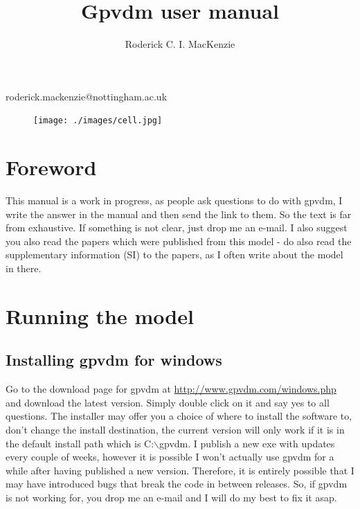 \documentclass[11pt]{article}
\begin{document}
\title{Gpvdm user manual}

\author{Roderick C. I. MacKenzie}


\maketitle




\centerline{roderick.mackenzie@nottingham.ac.uk}


\begin{figure}[ht!]
\centering
\texttt{[image: ./images/cell.jpg]}
\label{overflow}
\end{figure}

\newpage
\section{Foreword}
This manual is a work in progress, as people ask questions to do with gpvdm, I write the answer in the manual and then send the link to them.  So the text is far from exhaustive.  If something is not clear, just drop me an e-mail.  I also suggest you also read the papers which were published from this model - do also read the supplementary information (SI) to the papers, as I often write about the model in there.

\newpage

\section{Running the model}

\subsection{Installing gpvdm for windows}
Go to the download page for gpvdm at \url{http://www.gpvdm.com/windows.php} and download the latest version.  Simply double click on it and say yes to all questions.  The installer may offer you a choice of where to install the software to, don't change the install destination, the current version will only work if it is in the default install path which is C:$\backslash$gpvdm.  I publish a new exe with updates every couple of weeks, however it is possible I won't actually use gpvdm for a while after having published a new version.  Therefore, it is entirely possible that I may have introduced bugs that break the code in between releases.  So, if gpvdm is not working for, you drop me an e-mail and I will do my best to fix it asap.
\end{document}
